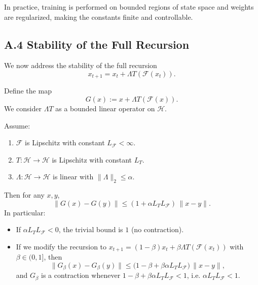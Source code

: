 \documentclass[11pt]{article}
\begin{document}
In practice, training is performed on bounded regions of state space and weights are regularized, making the constants finite and controllable.

\subsection*{A.4 Stability of the Full Recursion}

We now address the stability of the full recursion
\[
  x_{t+1} = x_t + \Lambda T(\mathcal{F}(x_t)).
\]

Define the map
\[
  G(x) := x + \Lambda T(\mathcal{F}(x)).
\]
We consider \(\Lambda T\) as a bounded linear operator on \(\mathcal{H}\).

\begin{theorem}
Assume:
\begin{enumerate}[label=(\roman*),leftmargin=*]
  \item \(\mathcal{F}\) is Lipschitz with constant \(L_{\mathcal{F}} < \infty\).
  \item \(T : \mathcal{H} \to \mathcal{H}\) is Lipschitz with constant \(L_T\).
  \item \(\Lambda : \mathcal{H} \to \mathcal{H}\) is linear with \(\|\Lambda\|_2 \leq \alpha\).
\end{enumerate}
Then for any \(x,y\),
\[
  \|G(x) - G(y)\|
  \leq (1 + \alpha L_T L_{\mathcal{F}})\,\|x-y\|.
\]
In particular:
\begin{itemize}[leftmargin=*]
  \item If \(\alpha L_T L_{\mathcal{F}} < 0\), the trivial bound is \(1\) (no contraction).
  \item If we modify the recursion to
        \(x_{t+1} = (1-\beta)x_t + \beta \Lambda T(\mathcal{F}(x_t))\)
        with \(\beta \in (0,1]\),
        then
        \[
          \|G_\beta(x) - G_\beta(y)\|
          \leq \bigl(1-\beta + \beta \alpha L_T L_{\mathcal{F}}\bigr)\,\|x-y\|,
        \]
        and \(G_\beta\) is a contraction whenever
        \(1-\beta + \beta \alpha L_T L_{\mathcal{F}} < 1\),
        i.e.
        \(\alpha L_T L_{\mathcal{F}} < 1\).
\end{itemize}
\end{theorem}
\end{document}
